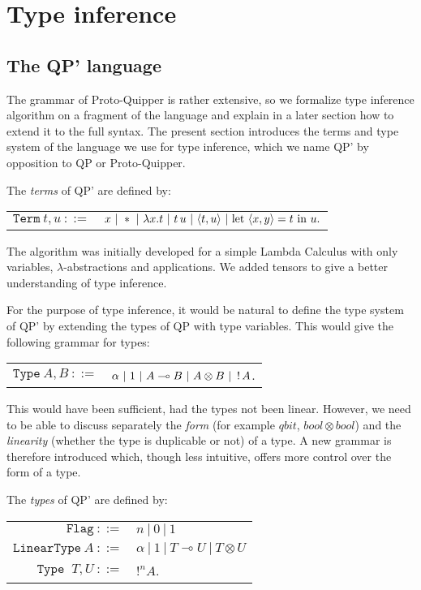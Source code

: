 \section{Type inference}

\subsection{The QP' language}

The grammar of Proto-Quipper is rather extensive, so we formalize type inference algorithm on a fragment of the language and explain in a later section how to extend it to the full syntax. The present section introduces the terms and type system of the language we use for type inference, which we name QP' by opposition to QP or Proto-Quipper. 

\begin{defn} The \emph{terms} of QP' are defined by:
	\begin{center}
	\begin{tabular}{rl}
		$\texttt{Term} ~t,u~ ::=$ & $x ~|~ * ~|~ \lambda x.t ~|~ t \, u ~|~ \langle t, u \rangle ~|~ \text{let}~ \langle x, y \rangle = t ~\text{in}~ u. $
	\end{tabular}
	\end{center}
\end{defn}

The algorithm was initially developed for a simple Lambda Calculus with only variables, $\lambda$-abstractions and applications. We added tensors to give a better understanding of type inference.

For the purpose of type inference, it would be natural to define the type system of QP' by extending the types of QP with type variables. This would give the following grammar for types:
	\begin{center}
	\begin{tabular}{rl}
		$\texttt{Type} ~A,B~ ::=$ & $\alpha ~|~ 1 ~|~ A \multimap B ~|~ A \otimes B ~|~ \,!\, A$.
	\end{tabular}
	\end{center}
This would have been sufficient, had the types not been linear. However, we need to be able to discuss separately the \textit{form} (for example $qbit$, $bool \otimes bool$) and the \textit{linearity} (whether the type is duplicable or not) of a type. A new grammar is therefore introduced which, though less intuitive, offers more control over the form of a type.

\begin{defn} The \emph{types} of QP' are defined by:
	\begin{center}
	\begin{tabular}{rl}
		$\texttt{Flag}~ ::=$ & $n ~|~ 0 ~|~ 1$ \\		
		$\texttt{LinearType} ~A~ ::=$ & $\alpha ~|~ 1 ~|~ T \multimap U ~|~ T \otimes U$ \\
		$\texttt{Type	} ~T,U~ ::=$ & $!^n A$.
	\end{tabular}
	\end{center}
\end{defn}

